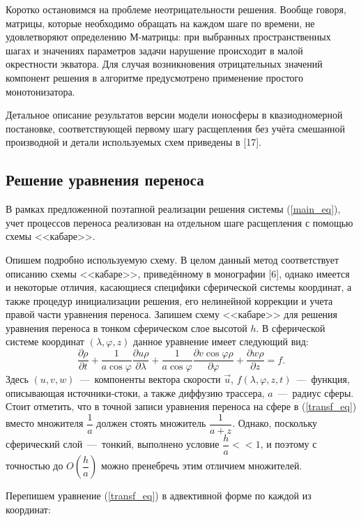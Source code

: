 \documentclass[14pt, a4paper]{extarticle}
\begin{document}
Коротко остановимся на проблеме неотрицательности решения. Вообще говоря, матрицы, которые необходимо обращать на каждом шаге по времени, не удовлетворяют определению М-матрицы: при выбранных пространственных шагах и значениях параметров задачи нарушение происходит в малой окрестности экватора. Для случая возникновения отрицательных значений компонент решения в алгоритме предусмотрено применение простого монотонизатора.

Детальное описание результатов версии модели ионосферы в квазиодномерной постановке, соответствующей первому шагу расщепления без учёта смешанной производной и детали используемых схем приведены в [17].

\subsection{Решение уравнения переноса}

В рамках предложенной поэтапной реализации решения системы (\ref{main_eq}), учет процессов переноса реализован на отдельном шаге расщепления с помощью схемы <<кабаре>>. 

Опишем подробно используемую схему. В целом данный метод соответствует описанию схемы <<кабаре>>, приведённому в монографии [6], однако имеется и некоторые отличия, касающиеся специфики сферической системы координат, а также процедур инициализации решения, его нелинейной коррекции и учета правой части уравнения переноса.
Запишем схему <<кабаре>> для решения уравнения переноса в тонком сферическом слое высотой $h$. В сферической системе координат $(\lambda, \varphi, z)$ данное уравнение имеет следующий вид: \begin{equation}\label{transf_eq}\dfrac{\partial \rho}{\partial t} + \dfrac{1}{a\cos\varphi} \dfrac{\partial u\rho}{\partial \lambda} + \dfrac{1}{a\cos\varphi} \dfrac{\partial v\cos\varphi\rho}{\partial \varphi} + \dfrac{\partial w\rho}{\partial z} = f. 
\end{equation} Здесь $(u, v, w)$~---~компоненты вектора скорости $\vec{u}$, $f(\lambda, \varphi, z, t)$~---~функция, описывающая источники-стоки, а также диффузию трассера, $a$~---~радиус сферы. Стоит отметить, что в точной записи уравнения переноса на сфере в (\ref{transf_eq}) вместо множителя $\dfrac{1}{a}$ должен стоять множитель $\dfrac{1}{a+z}$. Однако, поскольку сферический слой~---~тонкий, выполнено условие $\dfrac{h}{a}<<1$, и поэтому с точностью до $O\left(\dfrac{h}{a}\right)$ можно пренебречь этим отличием множителей.

Перепишем уравнение (\ref{transf_eq}) в адвективной форме по каждой из координат: 
\end{document}
